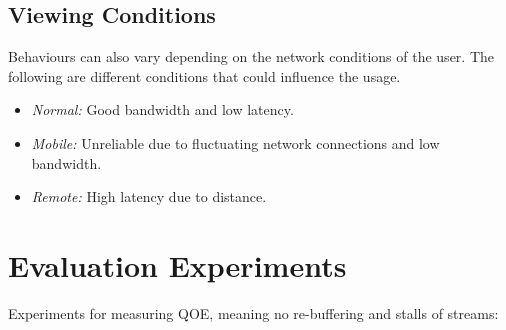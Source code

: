\subsection{Viewing Conditions}
\label{sec:viewing-conmditions}
Behaviours can also vary depending on the network conditions of the user. The following are different conditions that could influence the usage.
\begin{itemize}
    \item \textit{Normal:}
    Good bandwidth and low latency.
    \item \textit{Mobile:}
    Unreliable due to fluctuating network connections and low bandwidth.
    \item \textit{Remote:}
    High latency due to distance.
\end{itemize}


\section{Evaluation Experiments}
\label{sec:des-evaluation}
Experiments for measuring \ac{QOE}, meaning no re-buffering and stalls of streams:
